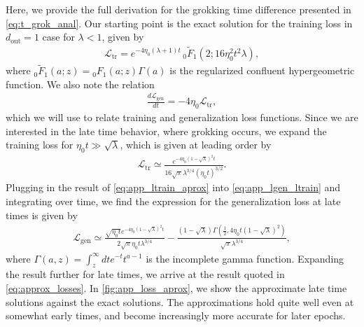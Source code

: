 \documentclass[a4paper,11pt]{article}
\newcommand{\dout}{d_\mathrm{out}}
\newcommand{\training}{\mathrm{tr}}
\newcommand{\gen}{\mathrm{gen}}
\newcommand{\mcL}{\mathcal{L}}
\begin{document}
Here, we provide the full derivation for the grokking time difference presented in \cref{eq:t_grok_anal}.
Our starting point is the exact solution for the training loss in $\dout=1$ case for $\lambda<1$, given by
\begin{align}
    \mathcal{L}_\training=e^{-4 \eta_0 (\lambda +1) t} \, _0\tilde{F}_1\left(2;16 \eta_0^2 t^2 \lambda \right),
\end{align}
where $_0\tilde{F}_1 \left(a;z\right)= {_0{F}_1} (a;z)\Gamma (a)$ is the regularized confluent hypergeometric function.
We also note the relation 
\begin{align}
\label{eq:app_lgen_ltrain}
    \frac{d \mcL_\gen}{dt }
    =
    -4\eta_0 \mcL_\training,
\end{align}
which we will use to relate training and generalization loss functions.
Since we are interested in the late time behavior, where grokking occurs, we expand the training loss for $\eta_0 t \gg \sqrt{\lambda}$, which is given at leading order by
\begin{align}
\label{eq:app_ltrain_aprox}
    \mathcal{L}_\training
    \simeq
    \frac{e^{-4 \eta_0  \left(1-\sqrt{\lambda }\right)^2 t}}{16 \sqrt{\pi } \lambda ^{3/4} (\eta_0  t)^{3/2}}.
\end{align}
Plugging in the result of \cref{eq:app_ltrain_aprox} into \cref{eq:app_lgen_ltrain} and integrating over time, we find the expression for the generalization loss at late times is given by
\begin{align}
\label{eq:app_lgen_aprox}
  \mcL_\gen
    \simeq
\frac{\sqrt{\eta_0  t} e^{-4 \eta_0  \left(1-\sqrt{\lambda }\right)^2 t}}{2 \sqrt{\pi } \eta_0  t \lambda ^{3/4} }-\frac{\left(1-\sqrt{\lambda }\right) \Gamma \left(\frac{1}{2},4  \eta_0 t  \left(1-\sqrt{\lambda }\right)^2\right)}{\sqrt{\pi } \lambda ^{3/4}},
\end{align}
where $\Gamma (a,z)=\int _z^{\infty }d t  e^{-t}t^{a-1}$ is the incomplete gamma function. Expanding the result further for late times, we arrive at the result quoted in \cref{eq:approx_losses}.
In \cref{fig:app_loss_aprox}, we show the approximate late time solutions against the exact solutions. The approximations hold quite well even at somewhat early times, and become increasingly more accurate for later epochs.
\end{document}
